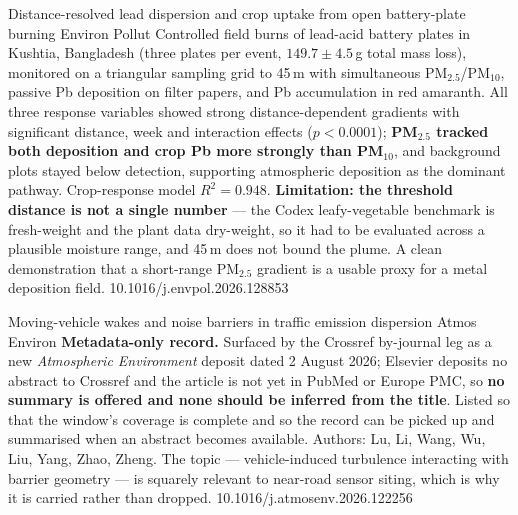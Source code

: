 \documentclass[10pt]{article}
\begin{document}
{Distance-resolved lead dispersion and crop uptake from open battery-plate burning}
{Environ Pollut}
{Controlled field burns of lead-acid battery plates in Kushtia, Bangladesh (three plates
per event, $149.7 \pm 4.5$\,g total mass loss), monitored on a triangular sampling grid
to 45\,m with simultaneous PM$_{2.5}$/PM$_{10}$, passive Pb deposition on filter papers,
and Pb accumulation in red amaranth. All three response variables showed strong
distance-dependent gradients with significant distance, week and interaction effects
($p<0.0001$); \textbf{PM$_{2.5}$ tracked both deposition and crop Pb more strongly than
PM$_{10}$}, and background plots stayed below detection, supporting atmospheric deposition
as the dominant pathway. Crop-response model $R^2 = 0.948$. \textbf{Limitation: the
threshold distance is not a single number} --- the Codex leafy-vegetable benchmark is
fresh-weight and the plant data dry-weight, so it had to be evaluated across a plausible
moisture range, and 45\,m does not bound the plume. A clean demonstration that a
short-range PM$_{2.5}$ gradient is a usable proxy for a metal deposition field.}
{10.1016/j.envpol.2026.128853}

{Moving-vehicle wakes and noise barriers in traffic emission dispersion}
{Atmos Environ}
{\textbf{Metadata-only record.} Surfaced by the Crossref by-journal leg as a new
\textit{Atmospheric Environment} deposit dated 2 August 2026; Elsevier deposits no
abstract to Crossref and the article is not yet in PubMed or Europe PMC, so \textbf{no
summary is offered and none should be inferred from the title}. Listed so that the
window's coverage is complete and so the record can be picked up and summarised when an
abstract becomes available. Authors: Lu, Li, Wang, Wu, Liu, Yang, Zhao, Zheng. The
topic --- vehicle-induced turbulence interacting with barrier geometry --- is squarely
relevant to near-road sensor siting, which is why it is carried rather than dropped.}
{10.1016/j.atmosenv.2026.122256}

\end{document}
